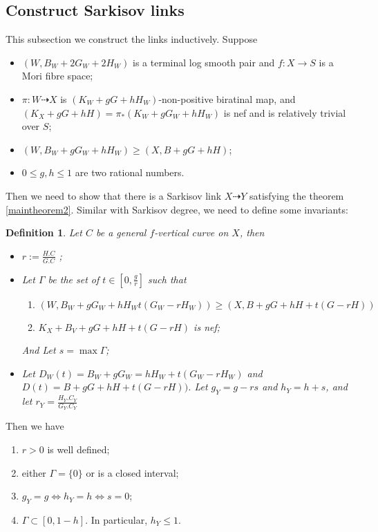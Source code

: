 \documentclass{article}
\newtheorem{defn}{Definition}[subsection]
\begin{document}
\subsection{Construct Sarkisov links}

This subsection we construct the links inductively. Suppose 
\begin{itemize}
  \item $(W,B_{W}+2G_{W}+2H_{W})$ is a terminal log smooth pair and $f:X\to S$ is a Mori fibre space;
  \item $\pi:W\dashrightarrow  X$ is $(K_{W}+gG+hH_{W})$-non-positive biratinal map, and $(K_{X}+gG+hH)=\pi_{*}(K_{W}+gG_{W}+hH_{W})$ is nef and is relatively trivial over $S$;
  \item $(W,B_{W}+gG_{W}+hH_{W})\geqslant (X,B+gG+hH)$;
  \item $0\leqslant g,h\leqslant 1$ are two rational numbers.
\end{itemize}
Then we need to show that there is a Sarkisov link $X\dashrightarrow Y$ satisfying the theorem \ref{maintheorem2}. Similar with Sarkisov degree, we need to define some invariants:
\begin{defn}
  Let $C$ be a general $f$-vertical curve on $X$, then
  \begin{itemize}
    \item $r:=\frac{H.C}{G.C}$ ;
    \item Let $\Gamma$ be the set of $t\in [0,\frac{g}{r}] $ such that 
      \begin{enumerate}
        \item $(W,B_{W}+gG_{W}+hH_{W}t(G_{W}-rH_{W}))\geqslant (X,B+gG+hH+t(G-rH))$
        \item $K_{X}+B_{V}+gG+hH+t(G-rH)$ is nef;
    \end{enumerate}
    And Let $s=\max \Gamma $;
  \item Let $D_{W}(t)=B_{W}+gG_{W}=hH_{W}+t(G_{W}-rH_{W})$ and $D(t)=B+gG+hH+t(G-rH))$. Let $g_Y=g-rs$ and $h_{Y}=h+s$, and let $r_{Y}=\frac{H_{Y}.C_{Y}}{G_{Y}.C_{Y}}$
  \end{itemize}
\end{defn}
Then we have 
\begin{enumerate}
    \item $r>0$ is well defined;
    \item either $\Gamma=\{0\} $ or is a closed interval;
    \item $g_{Y}=g \Leftrightarrow h_{Y}=h \Leftrightarrow s=0$;
    \item $\Gamma \subset [0,1-h]$. In particular, $h_{Y}\leqslant 1$.
\end{enumerate}
\end{document}
